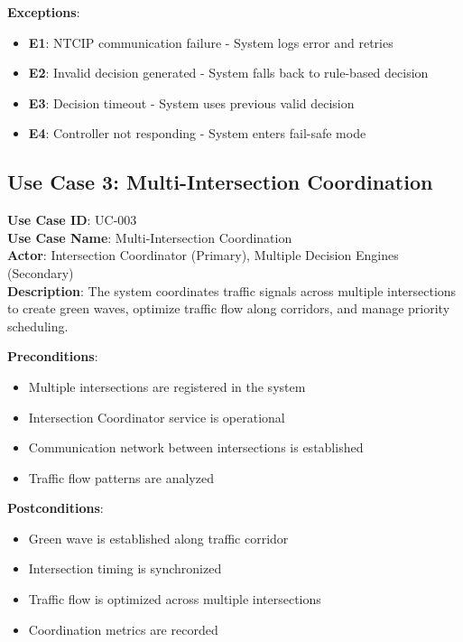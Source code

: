 \documentclass[12pt,a4paper]{article}
\begin{document}
\textbf{Exceptions}:
\begin{itemize}
    \item \textbf{E1}: NTCIP communication failure - System logs error and retries
    \item \textbf{E2}: Invalid decision generated - System falls back to rule-based decision
    \item \textbf{E3}: Decision timeout - System uses previous valid decision
    \item \textbf{E4}: Controller not responding - System enters fail-safe mode
\end{itemize}

\subsection{Use Case 3: Multi-Intersection Coordination}

\textbf{Use Case ID}: UC-003 \\
\textbf{Use Case Name}: Multi-Intersection Coordination \\
\textbf{Actor}: Intersection Coordinator (Primary), Multiple Decision Engines (Secondary) \\
\textbf{Description}: The system coordinates traffic signals across multiple intersections to create green waves, optimize traffic flow along corridors, and manage priority scheduling.

\textbf{Preconditions}:
\begin{itemize}
    \item Multiple intersections are registered in the system
    \item Intersection Coordinator service is operational
    \item Communication network between intersections is established
    \item Traffic flow patterns are analyzed
\end{itemize}

\textbf{Postconditions}:
\begin{itemize}
    \item Green wave is established along traffic corridor
    \item Intersection timing is synchronized
    \item Traffic flow is optimized across multiple intersections
    \item Coordination metrics are recorded
\end{itemize}
\end{document}
